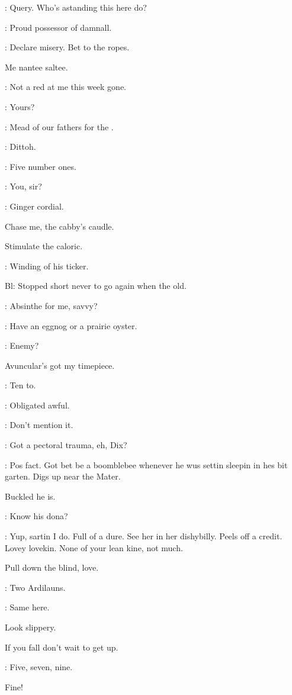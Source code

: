 
\lenehan:
Query.
Who's astanding this here do?

\madden:
Proud possessor of damnall.

\lynch:
Declare misery.
Bet to the ropes.

Me nantee saltee.

\dixon:
Not a red at me this week gone.

\barman:
Yours?

\stephen:
Mead of our fathers for the .

\bannon:
Dittoh.

\stephen:
Five number ones.

\barman:
You,
sir?

\Bloom:
Ginger cordial.

Chase me,
the cabby's caudle.

Stimulate the caloric.

:
Winding of his ticker.

Bl:
Stopped short never to go again when the old.

\stephen:
Absinthe for me,
savvy?

\mulligan:
 Have an eggnog or a prairie oyster.

\Bloom:
Enemy?

Avuncular's got my timepiece.

\madden:
Ten to.

\Bloom:
Obligated awful.

\madden:
Don't mention it.

\lynch:
Got a pectoral trauma,
eh,
Dix?

\dixon:
Pos fact.
Got bet be a boomblebee whenever he wus
settin sleepin in hes bit garten.
Digs up near the Mater.

Buckled he is.

\mulligan:
Know his dona?

\dixon:
Yup,
sartin I do.
Full of a dure.
See her in her dishybilly.
Peels off a credit.
Lovey lovekin.
None of your lean kine,
not much.

Pull down the blind,
love.

\madden:
Two Ardilauns.

\lynch:
Same here.

Look slippery.

If you fall don't wait to get up.

\barman:
Five,
seven,
nine.

Fine!

